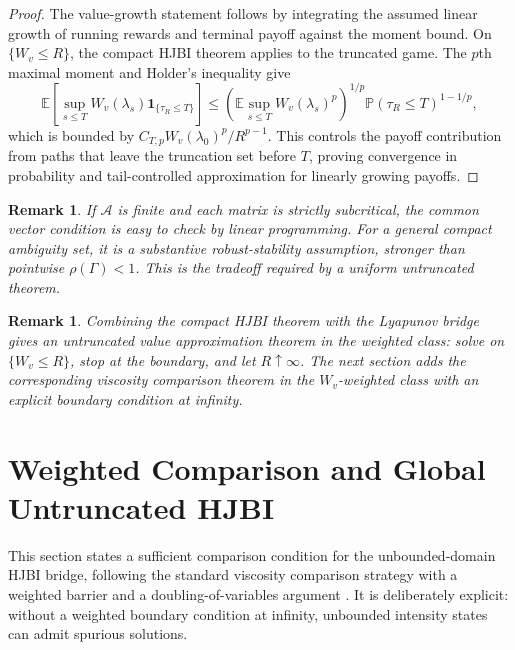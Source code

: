 \documentclass[11pt]{article}
\newtheorem{remark}[assumption]{Remark}
\newcommand{\E}{\mathbb{E}}
\begin{document}
\begin{proof}
The value-growth statement follows by integrating the assumed linear growth of
running rewards and terminal payoff against the moment bound. On
$\{W_v\le R\}$, the compact HJBI theorem applies to the truncated game. The
$p$th maximal moment and Holder's inequality give
\[
\E\left[
\sup_{s\le T}W_v(\lambda_s)\mathbf 1_{\{\tau_R\le T\}}
\right]
\le
\left(\E\sup_{s\le T}W_v(\lambda_s)^p\right)^{1/p}
\mathbb P(\tau_R\le T)^{1-1/p},
\]
which is bounded by $C_{T,p}W_v(\lambda_0)^p/R^{p-1}$. This controls the payoff
contribution from paths that leave the truncation set before $T$, proving
convergence in probability and tail-controlled approximation for linearly
growing payoffs.
\end{proof}

\begin{remark}
If $\mathcal A$ is finite and each matrix is strictly subcritical, the common
vector condition is easy to check by linear programming. For a general compact
ambiguity set, it is a substantive robust-stability assumption, stronger than
pointwise $\rho(\Gamma)<1$. This is the tradeoff required by a uniform
untruncated theorem.
\end{remark}

\begin{remark}
Combining the compact HJBI theorem with the Lyapunov bridge gives an
untruncated value approximation theorem in the weighted class: solve on
$\{W_v\le R\}$, stop at the boundary, and let $R\uparrow\infty$. The next
section adds the corresponding viscosity comparison theorem in the
$W_v$-weighted class with an explicit boundary condition at infinity.
\end{remark}

\section{Weighted Comparison and Global Untruncated HJBI}

This section states a sufficient comparison condition for the unbounded-domain
HJBI bridge, following the standard viscosity comparison strategy with a
weighted barrier and a doubling-of-variables argument
\cite{CrandallIshiiLions1992,FlemingSoner2006}. It is deliberately explicit:
without a weighted
boundary condition at infinity, unbounded intensity states can admit spurious
solutions.
\end{document}
